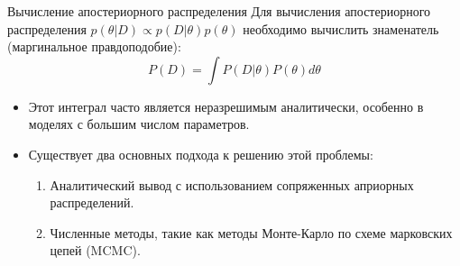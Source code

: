 \documentclass[notheorems, handout]{beamer}
\begin{document}
\begin{frame}{Вычисление апостериорного распределения}
    Для вычисления апостериорного распределения $p(\theta|D) \propto p(D|\theta)p(\theta)$ необходимо вычислить знаменатель (маргинальное правдоподобие):
    \begin{equation*}
        P(D) = \int P(D | \theta) P(\theta) d\theta
    \end{equation*}
    \begin{itemize}
        \item Этот интеграл часто является неразрешимым аналитически, особенно в моделях с большим числом параметров.
        \item Существует два основных подхода к решению этой проблемы:
        \begin{enumerate}
            \item Аналитический вывод с использованием сопряженных априорных распределений.
            \item Численные методы, такие как методы Монте-Карло по схеме марковских цепей (MCMC).
        \end{enumerate}
    \end{itemize}
\end{frame}
\end{document}

